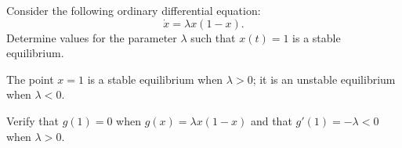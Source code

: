 \documentclass{ximera}
\begin{document}
\begin{exercise} \label{c3.3.3}
Consider the following ordinary differential equation:
\[
\dot{x} = \lambda x(1-x).
\]
Determine values for the parameter $\lambda$ such
that $x(t)=1$ is a stable equilibrium.

\begin{solution}

\ans The point $x = 1$ is a stable equilibrium when $\lambda > 0$; it is
an unstable equilibrium when $\lambda < 0$. 

\soln Verify that $g(1) = 0$ when $g(x) = \lambda x(1-x)$ and that $g'(1) = -\lambda<0$ when $\lambda>0$. 

\end{solution}
\end{exercise}
\end{document}
